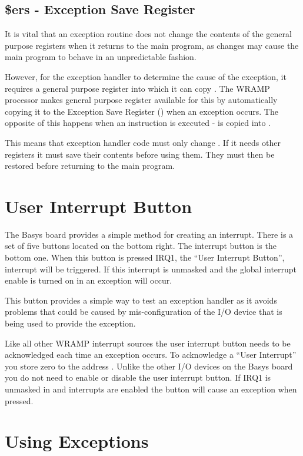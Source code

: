 \subsection{\$ers - Exception Save Register}

It is vital that an exception routine does not change the contents of the
general purpose registers when it returns to the main program, as changes
may cause the main program to behave in an unpredictable fashion.

However, for the exception handler to determine the cause of the exception,
it requires a general purpose register into which it can copy
. The WRAMP processor makes general purpose register 
available for this by automatically copying it to the Exception Save
Register () when an exception occurs. The opposite of this happens
when an  instruction is executed -  is copied into
.

This means that exception handler code must only change .  If
it needs other registers it must save their contents before using
them.  They must then be restored before returning to the main
program.

\section{User Interrupt Button}

The Basys board provides a simple method for creating an
interrupt. There is a set of five buttons located on the bottom right.
The interrupt button is the bottom one. When this button is pressed IRQ1,
the ``User Interrupt Button'', interrupt will be triggered. If this
interrupt is unmasked and the global interrupt enable is turned on in
 an exception will occur.

This button provides a simple way to test an exception handler as it
avoids problems that could be caused by mis-configuration of the I/O
device that is being used to provide the exception.

Like all other WRAMP interrupt sources the user interrupt button needs
to be acknowledged each time an exception occurs. To acknowledge a
``User Interrupt'' you store zero to the address
. Unlike the other I/O devices on the Basys board you do
not need to enable or disable the user interrupt button. If IRQ1 is
unmasked in  and interrupts are enabled the button
will cause an exception when pressed.

\section{Using Exceptions}

